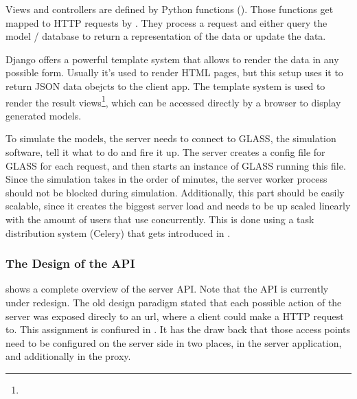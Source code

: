 Views and controllers are defined by Python functions ().
Those functions get mapped to HTTP requests by .
They process a request and either query the model / database to return a representation of the data or update the data.



Django offers a powerful template system that allows to render the data in any possible form.
Usually it's used to render HTML pages, but this setup uses it to return JSON data obejcts to the client app.
The template system is used to render the result views\footnote{}, which can be accessed directly by a browser to display generated models.

To simulate the models, the server needs to connect to GLASS, the simulation software, tell it what to do and fire it up.
The server creates a config file for GLASS for each request, and then starts an instance of GLASS running this file.
Since the simulation takes in the order of minutes, the server worker process should not be blocked during simulation.
Additionally, this part should be easily scalable, since it creates the biggest server load and needs to be up scaled linearly with the amount of users that use \spl concurrently.
This is done using a task distribution system (Celery) that gets introduced in .







\subsubsection{The Design of the API}





 shows a complete overview of the server API.
Note that the API is currently under redesign.
The old design paradigm stated that each possible action of the server was exposed direcly to an url, where a client could make a HTTP request to. This assignment is confiured in .
It has the draw back that those access points need to be configured on the server side in two places, in the server application, and additionally in the proxy.

